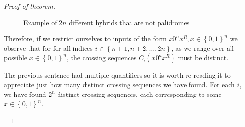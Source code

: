 \documentclass[usletter]{article}
\begin{document}
\begin{proof}[Proof of theorem]
\begin{figure}[h]
    \caption{Example of \(2n\) different hybrids that are not palidromes}
    \end{figure}
    
    Therefore, if we restrict ourselves to inputs of the form \(x0^nx^R, x \in \left\{ 0,1 \right\}^n\) we observe that for for all indices \(i \in \left\{ n+1, n+2, \ldots, 2n \right\}\), 
    as we range over all possible \(x \in \left\{ 0,1 \right\}^n\), the crossing sequences \(C_i(x0^nx^R)\) must be distinct. 

    \begin{remark}
            The previous sentence had multiple quantifiers so it is worth re-reading it
            to appreciate just how many distinct crossing sequences we have found. For each \(i\), we have found \(2^n\) distinct crossing sequences, each corresponding to some \(x \in \left\{ 0,1 \right\}^n\).
    \end{remark}


\end{proof}
\end{document}
